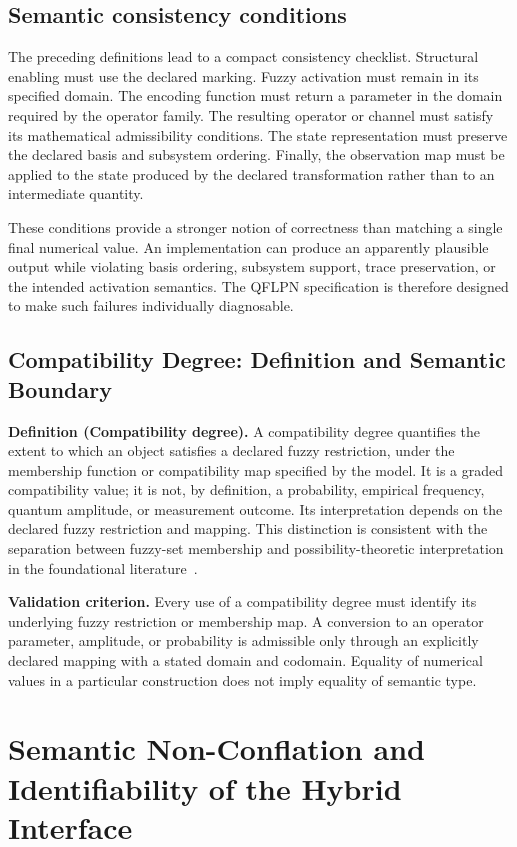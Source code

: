 \documentclass[final,3p,times]{elsarticle}
\begin{document}
\subsection{Semantic consistency conditions}

The preceding definitions lead to a compact consistency checklist. Structural enabling must use the declared marking. Fuzzy activation must remain in its specified domain. The encoding function must return a parameter in the domain required by the operator family. The resulting operator or channel must satisfy its mathematical admissibility conditions. The state representation must preserve the declared basis and subsystem ordering. Finally, the observation map must be applied to the state produced by the declared transformation rather than to an intermediate quantity.

These conditions provide a stronger notion of correctness than matching a single final numerical value. An implementation can produce an apparently plausible output while violating basis ordering, subsystem support, trace preservation, or the intended activation semantics. The QFLPN specification is therefore designed to make such failures individually diagnosable.

\subsection{Compatibility Degree: Definition and Semantic Boundary}
\textbf{Definition (Compatibility degree).} A compatibility degree quantifies the extent to which an object satisfies a declared fuzzy restriction, under the membership function or compatibility map specified by the model. It is a graded compatibility value; it is not, by definition, a probability, empirical frequency, quantum amplitude, or measurement outcome. Its interpretation depends on the declared fuzzy restriction and mapping. This distinction is consistent with the separation between fuzzy-set membership and possibility-theoretic interpretation in the foundational literature~\cite{ref9,ref25}.

\textbf{Validation criterion.} Every use of a compatibility degree must identify its underlying fuzzy restriction or membership map. A conversion to an operator parameter, amplitude, or probability is admissible only through an explicitly declared mapping with a stated domain and codomain. Equality of numerical values in a particular construction does not imply equality of semantic type.

\section{Semantic Non-Conflation and Identifiability of the Hybrid Interface}
\end{document}
